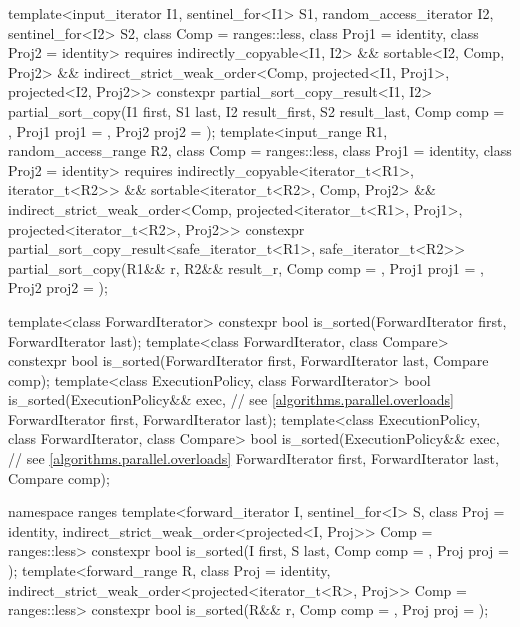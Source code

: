 \begin{codeblock}
{{    template<input_iterator I1, sentinel_for<I1> S1,
             random_access_iterator I2, sentinel_for<I2> S2,
             class Comp = ranges::less, class Proj1 = identity, class Proj2 = identity>
      requires indirectly_copyable<I1, I2> && sortable<I2, Comp, Proj2> &&
               indirect_strict_weak_order<Comp, projected<I1, Proj1>, projected<I2, Proj2>>
      constexpr partial_sort_copy_result<I1, I2>
        partial_sort_copy(I1 first, S1 last, I2 result_first, S2 result_last,
                          Comp comp = {}, Proj1 proj1 = {}, Proj2 proj2 = {});
    template<input_range R1, random_access_range R2, class Comp = ranges::less,
             class Proj1 = identity, class Proj2 = identity>
      requires indirectly_copyable<iterator_t<R1>, iterator_t<R2>> &&
               sortable<iterator_t<R2>, Comp, Proj2> &&
               indirect_strict_weak_order<Comp, projected<iterator_t<R1>, Proj1>,
                                          projected<iterator_t<R2>, Proj2>>
      constexpr partial_sort_copy_result<safe_iterator_t<R1>, safe_iterator_t<R2>>
        partial_sort_copy(R1&& r, R2&& result_r, Comp comp = {},
                          Proj1 proj1 = {}, Proj2 proj2 = {});
  }

  template<class ForwardIterator>
    constexpr bool is_sorted(ForwardIterator first, ForwardIterator last);
  template<class ForwardIterator, class Compare>
    constexpr bool is_sorted(ForwardIterator first, ForwardIterator last,
                             Compare comp);
  template<class ExecutionPolicy, class ForwardIterator>
    bool is_sorted(ExecutionPolicy&& exec,                      // see \ref{algorithms.parallel.overloads}
                   ForwardIterator first, ForwardIterator last);
  template<class ExecutionPolicy, class ForwardIterator, class Compare>
    bool is_sorted(ExecutionPolicy&& exec,                      // see \ref{algorithms.parallel.overloads}
                   ForwardIterator first, ForwardIterator last,
                   Compare comp);

  namespace ranges {
    template<forward_iterator I, sentinel_for<I> S, class Proj = identity,
             indirect_strict_weak_order<projected<I, Proj>> Comp = ranges::less>
      constexpr bool is_sorted(I first, S last, Comp comp = {}, Proj proj = {});
    template<forward_range R, class Proj = identity,
             indirect_strict_weak_order<projected<iterator_t<R>, Proj>> Comp = ranges::less>
      constexpr bool is_sorted(R&& r, Comp comp = {}, Proj proj = {});
  }

}
\end{codeblock}
